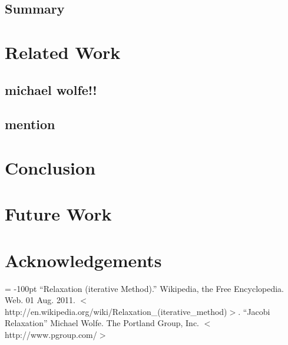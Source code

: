 \documentclass[10pt, twocolumn]{article}
\begin{document}


\subsection{Summary} %

\section{Related Work} %
    \subsection{michael wolfe!!}
    \subsection{mention} %

\section{Conclusion} %

\section{Future Work} %
\section{Acknowledgements} %

\begin{flushleft}
\begin{thebibliography}{99}
\topmargin = -100pt
    ``Relaxation (iterative Method).''
        Wikipedia, the Free Encyclopedia. Web. 01 Aug. 2011. $<$http://en.wikipedia.org/wiki/Relaxation\_(iterative\_method)$>$.
    ``Jacobi Relaxation''
        Michael Wolfe. The Portland Group, Inc. $<$http://www.pgroup.com/$>$
\end{thebibliography}
\end{flushleft}
\end{document}
